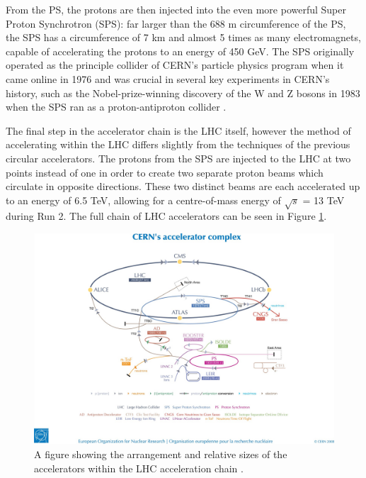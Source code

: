 \documentclass[12pt,a4paper,epsf,portrait,times,epsfig]{article}
\begin{document}
		From the PS, the protons are then injected into the even more powerful Super Proton Synchrotron (SPS): far larger than the 688 m circumference of the PS, the SPS has a circumference of 7 km and almost 5 times as many electromagnets, capable of accelerating the protons to an energy of 450 GeV. The SPS originally operated as the principle collider of CERN's particle physics program when it came online in 1976 and was crucial in several key experiments in CERN's history, such as the Nobel-prize-winning discovery of the W and Z bosons in 1983 when the SPS ran as a proton-antiproton collider \cite{WBosonDiscovery, ZBosonDiscovery}. 

		The final step in the accelerator chain is the LHC itself, however the method of accelerating within the LHC differs slightly from the techniques of the previous circular accelerators. The protons from the SPS are injected to the LHC at two points instead of one in order to create two separate proton beams which circulate in opposite directions. These two distinct beams are each accelerated up to an energy of 6.5 TeV, allowing for a centre-of-mass energy of $\sqrt{s}$ = 13 TeV during Run 2. The full chain of LHC accelerators can be seen in Figure \ref{Fig:CERNRings}. \par

		\begin{figure}
			\centering
			\includegraphics[scale=0.5]{LHC_Rings}
			\caption{A figure showing the arrangement and relative sizes of the accelerators within the LHC acceleration chain \cite{Article:CernComplex}.}
			\label{Fig:CERNRings}
		\end{figure}

\end{document}
